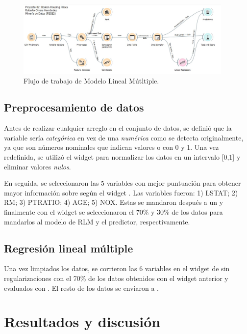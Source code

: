 \documentclass[11pt, letterpaper]{article}
\begin{document}
\begin{figure}[htb!]
	\centering
    \includegraphics[width=0.95\textwidth]{figuras/orange workflow.jpg}
	\caption{Flujo de trabajo de Modelo Lineal Mútltiple.}
	\label{fig:workflow}
\end{figure}

\subsection{Preprocesamiento de datos}
Antes de realizar cualquier arreglo en el conjunto de datos, se definió que la variable  sería \textit{categórica} en vez de una \textit{numérica} como se detecta originalmente, ya que son números nominales que indican valores  o  con 0 y 1. Una vez redefinida, se utilizó el widget  para normalizar los datos en un intervalo [0,1] y eliminar valores \textit{nulos}.

En seguida, se seleccionaron las 5 variables con mejor puntuación para obtener mayor información sobre  según el widget . Las variables fueron: 1) LSTAT; 2) RM; 3) PTRATIO; 4) AGE; 5) NOX. Estas se mandaron después a un  y finalmente con el widget  se seleccionaron el 70\% y 30\% de los datos para mandarlos al modelo de RLM y el predictor, respectivamente.

\subsection{Regresión lineal múltiple}
Una vez limpiados los datos, se corrieron las 6 variables en el widget de  sin regularizaciones con el 70\% de los datos obtenidos con el widget anterior y evaluados con . El resto de los datos se enviaron a .

\section{Resultados y discusión}
\end{document}
